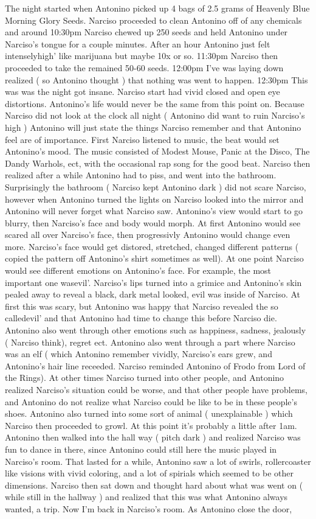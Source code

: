 \documentclass[12pt]{book}
\begin{document}
The night started when Antonino picked up 4 bags of 2.5 grams of Heavenly Blue Morning Glory Seeds. Narciso proceeded to clean Antonino off of any chemicals and around 10:30pm Narciso chewed up 250 seeds and held Antonino under Narciso's tongue for a couple minutes. After an hour Antonino just felt intenselyhigh' like marijuana but maybe 10x or so. 11:30pm Narciso then proceeded to take the remained 50-60 seeds. 12:00pm I've was laying down realized ( so Antonino thought ) that nothing was went to happen. 12:30pm This was was the night got insane. Narciso start had vivid closed and open eye distortions. Antonino's life would never be the same from this point on. Because Narciso did not look at the clock all night ( Antonino did want to ruin Narciso's high ) Antonino will just state the things Narciso remember and that Antonino feel are of importance. First Narciso listened to music, the beat would set Antonino's mood. The music consisted of Modest Mouse, Panic at the Disco, The Dandy Warhols, ect, with the occasional rap song for the good beat. Narciso then realized after a while Antonino had to piss, and went into the bathroom. Surprisingly the bathroom ( Narciso kept Antonino dark ) did not scare Narciso, however when Antonino turned the lights on Narciso looked into the mirror and Antonino will never forget what Narciso saw. Antonino's view would start to go blurry, then Narciso's face and body would morph. At first Antonino would see scared all over Narciso's face, then progressivly Antonino would change even more. Narciso's face would get distored, stretched, changed different patterns ( copied the pattern off Antonino's shirt sometimes as well). At one point Narciso would see different emotions on Antonino's face. For example, the most important one wasevil'. Narciso's lips turned into a grimice and Antonino's skin pealed away to reveal a black, dark metal looked, evil was inside of Narciso. At first this was scary, but Antonino was happy that Narciso revealed the so calledevil' and that Antonino had time to change this before Narciso die. Antonino also went through other emotions such as happiness, sadness, jealously ( Narciso think), regret ect. Antonino also went through a part where Narciso was an elf ( which Antonino remember vividly, Narciso's ears grew, and Antonino's hair line receeded. Narciso reminded Antonino of Frodo from Lord of the Rings). At other times Narciso turned into other people, and Antonino realized Narciso's situation could be worse, and that other people have problems, and Antonino do not realize what Narciso could be like to be in these people's shoes. Antonino also turned into some sort of animal ( unexplainable ) which Narciso then proceeded to growl. At this point it's probably a little after 1am. Antonino then walked into the hall way ( pitch dark ) and realized Narciso was fun to dance in there, since Antonino could still here the music played in Narciso's room. That lasted for a while, Antonino saw a lot of swirls, rollercoaster like visions with vivid coloring, and a lot of spirials which seemed to be other dimensions. Narciso then sat down and thought hard about what was went on ( while still in the hallway ) and realized that this was what Antonino always wanted, a trip. Now I'm back in Narciso's room. As Antonino close the door, 
\end{document}
